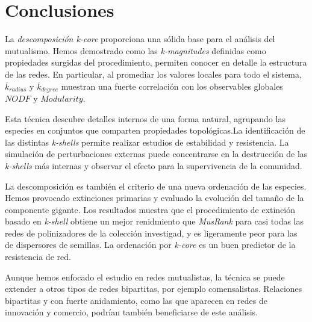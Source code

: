 \section{Conclusiones}

La \textit{descomposición k-core} proporciona una sólida base para el análisis del mutualismo. Hemos demostrado como las \textit{k-magnitudes} definidas como propiedades surgidas del procedimiento, permiten conocer en detalle la estructura de las redes. En particular, al promediar los valores locales para todo el sistema, $\overline {k}_{radius}$ y $\overline {k}_{degree}$ muestran una fuerte correlación con los observables globales $NODF$ y $Modularity$. 

Esta técnica descubre detalles internos de una forma natural, agrupando las especies en conjuntos que comparten propiedades topológicas.La identificación de las distintas \textit{k-shells} permite realizar estudios de estabilidad y resistencia. La simulación de perturbaciones externas puede concentrarse en la destrucción de las \textit{k-shells} más internas y observar el efecto para la supervivencia de la comunidad. 

La descomposición es también el criterio de una nueva ordenación de las especies. Hemos provocado extinciones primarias y evaluado la evolución del tamaño de la componente gigante. Los resultados muestra que el procedimiento de extinción basado en \textit{k-shell} obtiene un mejor renidmiento que \textit{MusRank} para casi todas las redes de polinizadores de la colección investigad, y es ligeramente peor para las de dispersores de semillas. La ordenación por \textit{k-core} es un buen predictor de la resistencia de red.

Aunque hemos enfocado el estudio en redes mutualistas, la técnica se puede extender a otros tipos de redes bipartitas, por ejemplo comensalistas. Relaciones bipartitas y con fuerte anidamiento, como las que aparecen en redes de innovación y comercio, podrían también beneficiarse de este análisis.